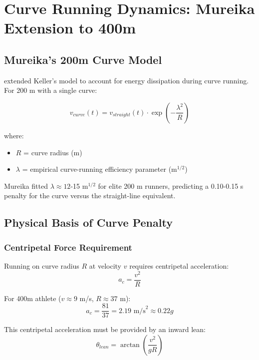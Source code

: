 \section{Curve Running Dynamics: Mureika Extension to 400m}

\subsection{Mureika's 200m Curve Model}

\citet{Mureika1997} extended Keller's model to account for energy dissipation during curve running. For 200 m with a single curve:

\begin{equation}
v_{curve}(t) = v_{straight}(t) \cdot \exp\left(-\frac{\lambda^2}{R}\right)
\end{equation}

where:
\begin{itemize}
    \item $R$ = curve radius (m)
    \item $\lambda$ = empirical curve-running efficiency parameter (m$^{1/2}$)
\end{itemize}

Mureika fitted $\lambda \approx 12$-15 m$^{1/2}$ for elite 200 m runners, predicting a 0.10-0.15 s penalty for the curve versus the straight-line equivalent.

\subsection{Physical Basis of Curve Penalty}

\subsubsection{Centripetal Force Requirement}

Running on curve radius $R$ at velocity $v$ requires centripetal acceleration:
\begin{equation}
a_c = \frac{v^2}{R}
\end{equation}

For 400m athlete ($v \approx 9$ m/s, $R \approx 37$ m):
\begin{equation}
a_c = \frac{81}{37} = 2.19 \text{ m/s}^2 \approx 0.22g
\end{equation}

This centripetal acceleration must be provided by an inward lean:
\begin{equation}
\theta_{lean} = \arctan\left(\frac{v^2}{gR}\right)
\end{equation}

